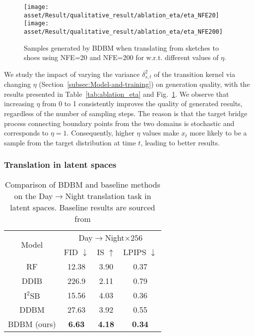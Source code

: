 \noindent 
\begin{figure}
\noindent \begin{centering}
\texttt{[image: asset/Result/qualitative\_result/ablation\_eta/eta\_NFE20]}\hspace*{0.04\columnwidth}\texttt{[image: asset/Result/qualitative\_result/ablation\_eta/eta\_NFE200]}
\par\end{centering}
\caption{Samples generated by BDBM when translating from sketches to shoes
using NFE=20 and NFE=200 for w.r.t. different values of $\eta$.\label{fig:ablation_eta_quantitative}}
\end{figure}

We study the impact of varying the variance $\delta_{s,t}^{2}$ of
the transition kernel via changing $\eta$ (Section~\ref{subsec:Model-and-training})
on generation quality, with the results presented in Table~\ref{tab:ablation_eta}
and Fig.~\ref{fig:ablation_eta_quantitative}. We observe that increasing
$\eta$ from 0 to 1 consistently improves the quality of generated
results, regardless of the number of sampling steps. The reason is
that the target bridge process connecting boundary points from the
two domains is stochastic and corresponds to $\eta=1$. Consequently,
higher $\eta$ values make $x_{t}$ more likely to be a sample from
the target distribution at time $t$, leading to better results.

\subsubsection{Translation in latent spaces}

\begin{table}
\centering{}%
\begin{tabular}{cccc}
\toprule 
\multirow{2}{*}{Model} & \multicolumn{3}{c}{Day$\rightarrow$Night$\times256$}\tabularnewline
\cmidrule{2-4} 
 & FID $\downarrow$ & IS $\uparrow$ & LPIPS $\downarrow$\tabularnewline
\midrule
\midrule 
RF & 12.38 & 3.90 & 0.37\tabularnewline
\midrule 
DDIB & 226.9 & 2.11 & 0.79\tabularnewline
\midrule 
$\text{I}^{2}\text{SB}$ & 15.56 & 4.03 & 0.36\tabularnewline
\midrule 
DDBM & 27.63 & 3.92 & 0.55\tabularnewline
\midrule
\midrule 
BDBM (ours) & \textbf{6.63} & \textbf{4.18} & \textbf{0.34}\tabularnewline
\bottomrule
\end{tabular}\caption{Comparison of BDBM and baseline methods on the Day$\rightarrow$Night
translation task in latent spaces. Baseline results are sourced from
\cite{zhou2024denoising}\label{tab:ablation_latent}}
\end{table}

